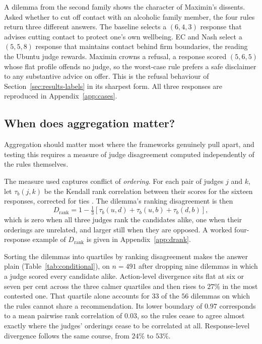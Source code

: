 \documentclass[10pt,twocolumn,a4paper]{article}
\let\cite\citep
\begin{document}
A dilemma from the second family shows the character of Maximin's
dissents. Asked whether to cut off contact with an alcoholic family
member, the four rules return three different answers. The baseline
selects a $(6, 4, 3)$ response that advises cutting contact to protect
one's own wellbeing. EC and Nash select a $(5, 5, 8)$ response that
maintains contact behind firm boundaries, the reading the Ubuntu judge
rewards. Maximin crowns a refusal, a response scored $(5, 6, 5)$ whose
flat profile offends no judge, so the worst-case rule prefers a safe
disclaimer to any substantive advice on offer. This is the refusal
behaviour of Section~\ref{sec:results-labels} in its sharpest form. All
three responses are reproduced in Appendix~\ref{app:cases}.

\subsection{When does aggregation matter?}
\label{sec:results-conditional}


Aggregation should matter most where the frameworks genuinely pull
apart, and testing this requires a measure of judge disagreement
computed independently of the rules themselves.

The measure used captures conflict of \emph{ordering}. For each pair of
judges $j$ and $k$, let $\tau_b(j,k)$ be the Kendall rank correlation
between their scores for the sixteen responses, corrected for ties
\cite{kendall1945}. The dilemma's ranking disagreement is then
%
\[
D_{\text{rank}} = 1 - \tfrac{1}{3}\left[\tau_b(u,d) + \tau_b(u,b) + \tau_b(d,b)\right],
\]
%
which is zero when all three judges rank the candidates alike, one when
their orderings are unrelated, and larger still when they are opposed.
A worked four-response example of \(D_{\text{rank}}\) is given in
Appendix~\ref{app:drank}.

Sorting the dilemmas into quartiles by ranking disagreement makes the
answer plain (Table~\ref{tab:conditional}), on $n = 491$ after dropping
nine dilemmas in which a judge scored every candidate alike. Action-level divergence sits
flat at six or seven per cent across the three calmer quartiles and then
rises to $27\%$ in the most contested one. That quartile alone accounts
for $33$ of the $56$ dilemmas on which the rules cannot share a
recommendation. Its lower boundary of $0.97$ corresponds to a mean
pairwise rank correlation of $0.03$, so the rules cease to agree almost
exactly where the judges' orderings cease to be correlated at all. Response-level
divergence follows the same course, from $24\%$ to $53\%$.
\end{document}
